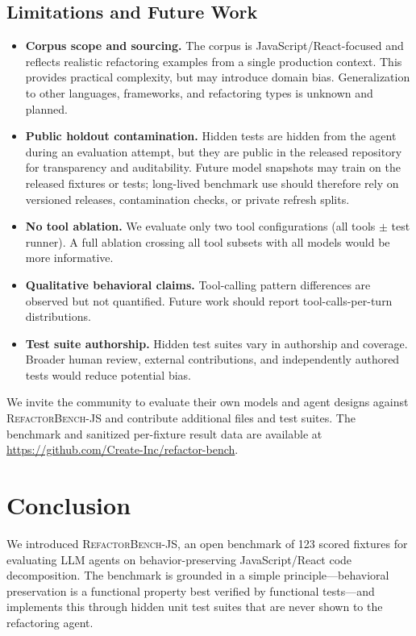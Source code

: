 \documentclass[11pt,letterpaper]{article}
\begin{document}
\subsection{Limitations and Future Work}

\begin{itemize}[leftmargin=2em]
\item \textbf{Corpus scope and sourcing.} The corpus is JavaScript/React-focused and reflects realistic refactoring examples from a single production context. This provides practical complexity, but may introduce domain bias. Generalization to other languages, frameworks, and refactoring types is unknown and planned.
\item \textbf{Public holdout contamination.} Hidden tests are hidden from the agent during an evaluation attempt, but they are public in the released repository for transparency and auditability. Future model snapshots may train on the released fixtures or tests; long-lived benchmark use should therefore rely on versioned releases, contamination checks, or private refresh splits.
\item \textbf{No tool ablation.} We evaluate only two tool configurations (all tools $\pm$ test runner). A full ablation crossing all tool subsets with all models would be more informative.
\item \textbf{Qualitative behavioral claims.} Tool-calling pattern differences are observed but not quantified. Future work should report tool-calls-per-turn distributions.
\item \textbf{Test suite authorship.} Hidden test suites vary in authorship and coverage. Broader human review, external contributions, and independently authored tests would reduce potential bias.
\end{itemize}

We invite the community to evaluate their own models and agent designs against \textsc{RefactorBench}-JS and contribute additional files and test suites. The benchmark and sanitized per-fixture result data are available at \url{https://github.com/Create-Inc/refactor-bench}.

\section{Conclusion}

We introduced \textsc{RefactorBench}-JS, an open benchmark of 123 scored fixtures for evaluating LLM agents on behavior-preserving JavaScript/React code decomposition. The benchmark is grounded in a simple principle---behavioral preservation is a functional property best verified by functional tests---and implements this through hidden unit test suites that are never shown to the refactoring agent.
\end{document}
